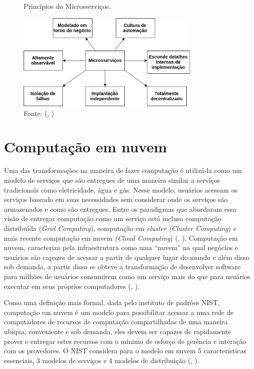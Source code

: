 \documentclass[]{politex}
\begin{document}
\begin{figure}[H]
    \centering
    \caption{Princípios do Microsserviços.}
    \includegraphics[width=0.8\textwidth]{microservices}
    \caption*{Fonte: (, \citeyear{Newman})}
    \label{fig:newman}
\end{figure}

\section{Computação em nuvem} \label{comp_nuvem}
Uma das transformações na maneira de fazer computação é utilizá-la como um modelo de serviços que são entregues de uma maneira similar a serviços tradicionais como eletricidade, água e gás. Nesse modelo, usuários acessam os serviços baseado em suas necessidades sem considerar onde os serviços são armazenados e como são entregues. Entre os paradigmas que abordaram essa visão de entregar computação como um serviço está incluso computação distribuída (\textit{Grid Computing}), computação em \textit{cluster} \textit{(Cluster Computing}) e mais recente computação em nuvem \textit{(Cloud Computing}) (, \citeyear{Buyya}).
Computação em nuvem, caracteriza pela infraestrutura como uma “nuvem” na qual negócios e usuários são capazes de acessar a partir de qualquer lugar do mundo e além disso sob demanda, a partir disso se obteve a transformação de desenvolver software para milhões de usuários consumirem como um serviço mais do que para usuários executar em seus próprios computadores (, \citeyear{Buyya}).

Como uma definição mais formal, dada pelo instituto de padrões NIST,  computação em nuvem é um modelo para possibilitar acessar a uma rede de computadores de recursos de computação compartilhadas de uma maneira ubíqua, conveniente e sob demanda, eles devem ser capazes de rapidamente prover e entregar estes recursos com o mínimo de esforço de gerência e interação com os provedores. O NIST considera para o modelo em nuvem 5 características essenciais,  3 modelos de serviços e 4 modelos de distribuição (, \citeyear{nist}).
\end{document}
